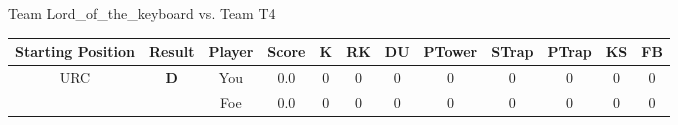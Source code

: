\documentclass[a4paper,12pt]{article}
\begin{document}
\begin{tabular}[t]{| c | c | c | c | c | c | c | c | c | c | c | c
      |}
                      
      
                      
      
                      
      
                      
      
                      
      
                      
                        \hline
                      \end{tabular}
                      
  \vspace*{2em}
  \par {\large {\color{Gray} Team} Lord\_of\_the\_keyboard {\color{Gray}
      vs. Team} T4}
  \newline
  \begin{tabular}[t]{| c | c | c | c | c | c | c | c | c | c | c | c
      |}
    \hline
    Starting Position & \textbf{Result} & Player & \textbf{Score} & K & RK & DU & PTower & STrap & PTrap & KS & FB \\
    
      
                      
      
                      
      
                      
      
                      
      
                      
      
        \hline
        \multirow{2}{*}{  URC
             } &
              \multirow{2}{*}{  
                  \textbf{D}  } & 
                    \cellcolor{yellow!25} You & \cellcolor{yellow!25} 0.0 & \cellcolor{yellow!25} 0 &
                    \cellcolor{yellow!25} 0 & \cellcolor{yellow!25} 0 & \cellcolor{yellow!25} 0 &
                    \cellcolor{yellow!25} 0 & \cellcolor{yellow!25} 0 & \cellcolor{yellow!25} 0 &
                    \cellcolor{yellow!25} 0 \\
                    \cline{3-12}
                    & & \cellcolor{red!15} Foe & \cellcolor{red!15} 0.0 & \cellcolor{red!15} 0 & \cellcolor{red!15}
                    0 & \cellcolor{red!15} 0
                    & \cellcolor{red!15} 0 & \cellcolor{red!15}
                    0 & \cellcolor{red!15} 0 
                    & \cellcolor{red!15} 0 & \cellcolor{red!15}
                    0 \\
                    
                      
      
                      
      

\end{tabular}
\end{document}
